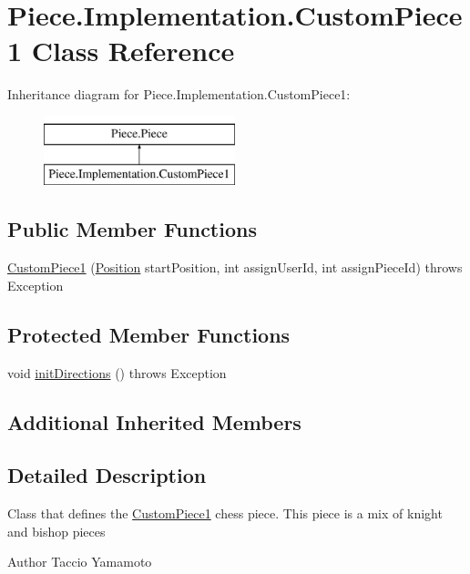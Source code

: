\hypertarget{classPiece_1_1Implementation_1_1CustomPiece1}{\section{Piece.\-Implementation.\-Custom\-Piece1 Class Reference}
\label{classPiece_1_1Implementation_1_1CustomPiece1}
}
Inheritance diagram for Piece.\-Implementation.\-Custom\-Piece1\-:\begin{figure}[H]
\begin{center}
\leavevmode
\includegraphics[height=2.000000cm]{classPiece_1_1Implementation_1_1CustomPiece1}
\end{center}
\end{figure}
\subsection*{Public Member Functions}
\begin{DoxyCompactItemize}
\item 
\hyperlink{classPiece_1_1Implementation_1_1CustomPiece1_af3736e05872f710d45a92e303d2efd0f}{Custom\-Piece1} (\hyperlink{classUtil_1_1Position}{Position} start\-Position, int assign\-User\-Id, int assign\-Piece\-Id)  throws Exception
\end{DoxyCompactItemize}
\subsection*{Protected Member Functions}
\begin{DoxyCompactItemize}
\item 
void \hyperlink{classPiece_1_1Implementation_1_1CustomPiece1_aa92e30cda4f19d89b622ec4bf2a6e78e}{init\-Directions} ()  throws Exception 
\end{DoxyCompactItemize}
\subsection*{Additional Inherited Members}


\subsection{Detailed Description}
Class that defines the \hyperlink{classPiece_1_1Implementation_1_1CustomPiece1}{Custom\-Piece1} chess piece. This piece is a mix of knight and bishop pieces \begin{DoxyAuthor}{Author}
Taccio Yamamoto 
\end{DoxyAuthor}


